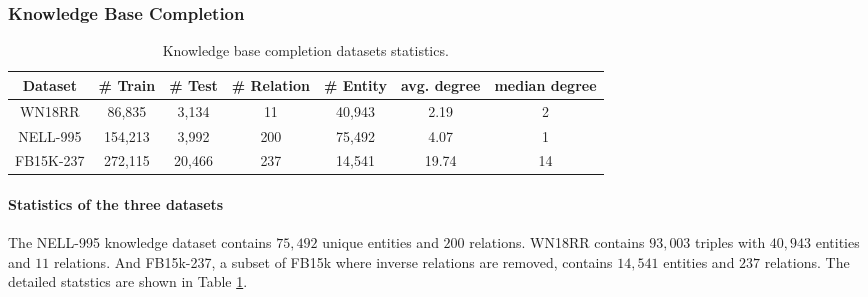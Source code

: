 \documentclass{article}
\begin{document}
\label{Appendix:puzzle_details}


\subsubsection{Knowledge Base Completion}
\label{Appendix:kbc_details}

\begin{table}[t]
\caption{Knowledge base completion datasets statistics.}
\label{tab:kbc_stats}
\centering
\begin{tabular}{c cccccc}
\toprule
Dataset  & \# Train & \# Test & \# Relation & \# Entity & avg. degree & median degree\\
\midrule
WN18RR & 86,835 & 3,134 & 11 & 40,943 &  2.19 & 2 \\
NELL-995 & 154,213 & 3,992 & 200 & 75,492 & 4.07 & 1 \\
FB15K-237 & 272,115 & 20,466 & 237 & 14,541 & 19.74 & 14\\
\bottomrule
\end{tabular}
\end{table}

\paragraph{Statistics of the three datasets}
The NELL-995 knowledge dataset contains $75,492$ unique entities and $200$ relations. 
WN18RR contains $93,003$ triples with $40,943$ entities and $11$ relations. And FB15k-237, a subset of FB15k where inverse relations are removed, contains $14,541$ entities and $237$ relations. The detailed statstics are shown in Table \ref{tab:kbc_stats}.
\end{document}
